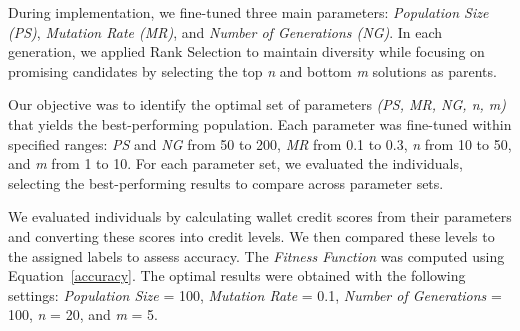 \documentclass[runningheads]{llncs}
\begin{document}
{During implementation, we fine-tuned three main parameters: \textit{Population Size (PS)}, \textit{Mutation Rate (MR)}, and \textit{Number of Generations (NG)}. In each generation, we applied Rank Selection to maintain diversity while focusing on promising candidates by selecting the top \textit{n} and bottom \textit{m} solutions as parents.



Our objective was to identify the optimal set of parameters \textit{(PS, MR, NG, n, m)} that yields the best-performing population.
Each parameter was fine-tuned within specified ranges: \textit{PS} and \textit{NG} from 50 to 200, \textit{MR} from 0.1 to 0.3, \textit{n} from 10 to 50, and 
\textit{m} from 1 to 10. %
For each parameter set, we evaluated the individuals, selecting the best-performing results to compare across parameter sets.



We evaluated individuals by calculating wallet credit scores from their parameters and converting these scores into credit levels. We then compared these levels to the assigned labels to assess accuracy. The \textit{Fitness Function} was computed using Equation~\ref{accuracy}. The optimal results were obtained with the following settings: \textit{Population Size} = 100, \textit{Mutation Rate} = 0.1, \textit{Number of Generations} = 100, \textit{n} = 20, and \textit{m} = 5. 

}
\end{document}
